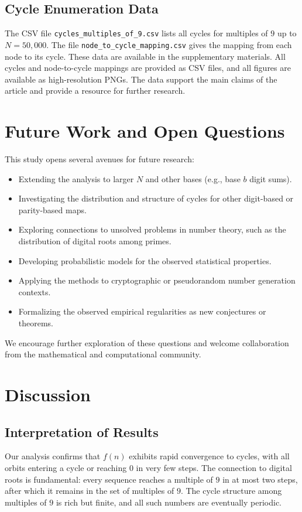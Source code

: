 \documentclass[12pt]{article}
\begin{document}
\subsection{Cycle Enumeration Data}
The CSV file \texttt{cycles\_multiples\_of\_9.csv} lists all cycles for multiples of $9$ up to $N=50,000$. The file \texttt{node\_to\_cycle\_mapping.csv} gives the mapping from each node to its cycle. These data are available in the supplementary materials.
All cycles and node-to-cycle mappings are provided as CSV files, and all figures are available as high-resolution PNGs. The data support the main claims of the article and provide a resource for further research.

\section{Future Work and Open Questions}
This study opens several avenues for future research:
\begin{itemize}
    \item Extending the analysis to larger $N$ and other bases (e.g., base $b$ digit sums).
    \item Investigating the distribution and structure of cycles for other digit-based or parity-based maps.
    \item Exploring connections to unsolved problems in number theory, such as the distribution of digital roots among primes.
    \item Developing probabilistic models for the observed statistical properties.
    \item Applying the methods to cryptographic or pseudorandom number generation contexts.
    \item Formalizing the observed empirical regularities as new conjectures or theorems.
\end{itemize}
We encourage further exploration of these questions and welcome collaboration from the mathematical and computational community.


\section{Discussion}
\subsection{Interpretation of Results}
Our analysis confirms that $f(n)$ exhibits rapid convergence to cycles, with all orbits entering a cycle or reaching $0$ in very few steps. The connection to digital roots is fundamental: every sequence reaches a multiple of $9$ in at most two steps, after which it remains in the set of multiples of $9$. The cycle structure among multiples of $9$ is rich but finite, and all such numbers are eventually periodic.
\end{document}
